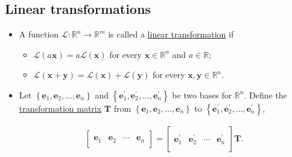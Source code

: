 \documentclass[12pt,thmsa]{article}
\begin{document}
\subsection{Linear transformations}

\begin{itemize}
	\item A function \(\mathcal{L}: \mathbb{R}^{n} \rightarrow \mathbb{R}^{m}\) is called a \underline{linear transformation} if
	
	\begin{itemize}
		\item \(\mathcal{L}(a \boldsymbol{x})=a \mathcal{L}(\boldsymbol{x})\) for every \(\boldsymbol{x} \in \mathbb{R}^{n}\) and \(a \in \mathbb{R}\);
		\item \(\mathcal{L}(\boldsymbol{x}+\boldsymbol{y})=\mathcal{L}(\boldsymbol{x})+\mathcal{L}(\boldsymbol{y})\) for every \(\boldsymbol{x}, \boldsymbol{y} \in \mathbb{R}^{n}. \)
		
	\end{itemize}

	\item Let \(\left\{\boldsymbol{e}_{1}, \boldsymbol{e}_{2}, \ldots, \boldsymbol{e}_{n}\right\}\) and \(\left\{\boldsymbol{e}_{1}^{\prime}, \boldsymbol{e}_{2}^{\prime}, \ldots, \boldsymbol{e}_{n}^{\prime}\right\}\) be two bases for \(\mathbb{R}^{n}\). Define the \underline{transformation matrix} \(\boldsymbol{T}\) from \(\left\{\boldsymbol{e}_{1}, \boldsymbol{e}_{2}, \ldots, \boldsymbol{e}_{n}\right\}\) to  \(\left\{\boldsymbol{e}_{1}^{\prime}, \boldsymbol{e}_{2}^{\prime}, \ldots, \boldsymbol{e}_{n}^{\prime}\right\}\),
	
	\begin{equation*}
		\begin{gathered}
			{\left[ \begin{array}{cccc}
					 &  &   &  \\
					\boldsymbol{e}_1 & \boldsymbol{e}_2 & \cdots & \boldsymbol{e}_n \\
					 &  &  & 
				\end{array} \right] =
			\left[ \begin{array}{cccc}
				 &  &   &  \\
				\boldsymbol{e}_1^{\prime} & \boldsymbol{e}_2^{\prime} & \cdots & \boldsymbol{e}_n^{\prime} \\
				 &  &   &
			\end{array} \right] \boldsymbol{T}}.
		\end{gathered}
	\end{equation*}


\end{itemize}
\end{document}

